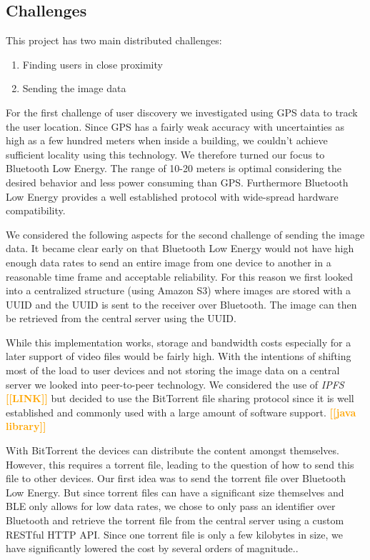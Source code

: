 \documentclass{report}
\newcommand{\todo}[1]{\textsf{\textbf{\textcolor{orange}{[[#1]]}}}}
\begin{document}
\subsection{Challenges}
This project has two main distributed challenges:
\begin{enumerate} 
    \item Finding users in close proximity
    \item Sending the image data
\end{enumerate}

For the first challenge of user discovery we investigated using GPS data to track the user location. Since GPS has a fairly weak accuracy with uncertainties as high as a few hundred meters when inside a building, we couldn't achieve sufficient locality using this technology. We therefore turned our focus to Bluetooth Low Energy. The range of 10-20 meters is optimal considering the desired behavior and less power consuming than GPS. Furthermore Bluetooth Low Energy provides a well established protocol with wide-spread hardware compatibility.

We considered the following aspects for the second challenge of sending the image data.
It became clear early on that Bluetooth Low Energy would not have high enough data rates to send an entire image from one device to another in a reasonable time frame and acceptable reliability. For this reason we first looked into a centralized structure (using Amazon S3) where images are stored with a UUID and the UUID is sent to the receiver over Bluetooth. The image can then be retrieved from the central server using the UUID.

While this implementation works, storage and bandwidth costs especially for a later support of video files would be fairly high. With the intentions of shifting most of the load to user devices and not storing the image data on a central server we looked into peer-to-peer technology. We considered the use of \textit{IPFS} \todo{LINK} but decided to use the BitTorrent file sharing protocol since it is well established and commonly used with a large amount of software support. \todo{java library} 

With BitTorrent the devices can distribute the content amongst themselves. However, this requires a torrent file, leading to the question of how to send this file to other devices. Our first idea was to send the torrent file over Bluetooth Low Energy. But since torrent files can have a significant size themselves and BLE only allows for low data rates, we chose to only pass an identifier over Bluetooth and retrieve the torrent file from the central server using a custom RESTful HTTP API. Since one torrent file is only a few kilobytes in size, we have significantly lowered the cost by several orders of magnitude..
\end{document}
